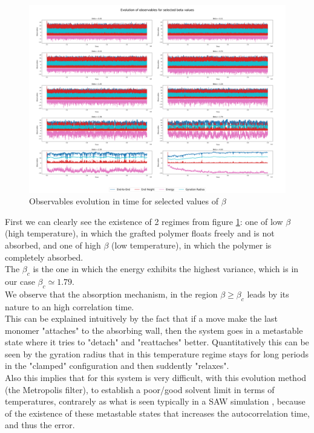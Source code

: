 \begin{figure}[H]
    \centering
    \includegraphics[width=\textwidth]{FIG/exercise_6_images/observables_polymer_summary.png}
    \caption{Observables evolution in time for selected values of $\beta$}
    \label{lec6:polymer_evolution_pre_mmc}
\end{figure}

First we can clearly see the existence of 2 regimes from figure \ref{lec6:polymer_evolution_pre_mmc}: one of low $\beta$ (high temperature), in which
the grafted polymer floats freely and is not absorbed, and one of high $\beta$ (low temperature), in which the polymer is completely absorbed. \\
The $\beta_c$ is the one in which the energy exhibits the highest variance, which is in our case $\beta_c \simeq 1.79$.\\ We observe that the absorption mechanism, in the region $\beta \geq \beta_c$ leads by its nature to an high correlation time. \\
This can be explained intuitively by the fact that if a move make the last monomer "attaches" to the absorbing wall, then the system goes in a metastable state where it tries to 
"detach" and "reattaches" better. Quantitatively this can be seen by the gyration radius that in this temperature regime stays for long periods in the "clamped" configuration
and then suddently "relaxes". \\
Also this implies that for this system is very difficult, with this evolution method (the Metropolis filter), to establish a poor/good solvent limit in terms of temperatures, contrarely as what is seen typically in a SAW simulation \cite{OrlandoBrando}, because of the existence 
of these metastable states that increases the autocorrelation time, and thus the error.

